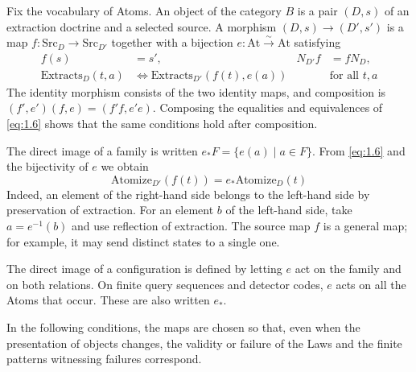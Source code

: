\begin{definition}\label{def:1.27}

Fix the vocabulary of Atoms. An object of the category $B$ is a pair $(D,s)$ of
an extraction doctrine and a selected source. A morphism $(D,s)\to(D',s')$ is a
map $f:\mathrm{Src}_D\to\mathrm{Src}_{D'}$ together with a bijection
$e:\mathrm{At}\xrightarrow{\sim}\mathrm{At}$ satisfying
\begin{equation*}
\begin{aligned}
f(s)&=s',&
N_{D'}f&=fN_D,\\
\mathrm{Extracts}_D(t,a)
&\Longleftrightarrow
\mathrm{Extracts}_{D'}(f(t),e(a))
&&\text{for all }t,a
\end{aligned}
\tag{1.6}\label{eq:1.6}
\end{equation*}
The identity morphism consists of the two identity maps, and composition is
$(f',e')(f,e)=(f'f,e'e)$.
Composing the equalities and equivalences of \eqref{eq:1.6} shows that the same
conditions hold after composition.

The direct image of a family is written $e_*F=\{e(a)\mid a\in F\}$.
From \eqref{eq:1.6} and the bijectivity of $e$ we obtain
\begin{equation*}
\mathrm{Atomize}_{D'}(f(t))=e_*\mathrm{Atomize}_D(t)
\tag{1.7}\label{eq:1.7}
\end{equation*}
Indeed, an element of the right-hand side belongs to the left-hand side by
preservation of extraction.
For an element $b$ of the left-hand side, take $a=e^{-1}(b)$ and use reflection
of extraction.
The source map $f$ is a general map; for example, it may send distinct states
to a single one.

The direct image of a configuration is defined by letting $e$ act on the family
and on both relations.
On finite query sequences and detector codes, $e$ acts on all the Atoms that
occur. These are also written $e_*$.

In the following conditions, the maps are chosen so that, even when the
presentation of objects changes, the validity or failure of the Laws and the
finite patterns witnessing failures correspond.

\end{definition}

